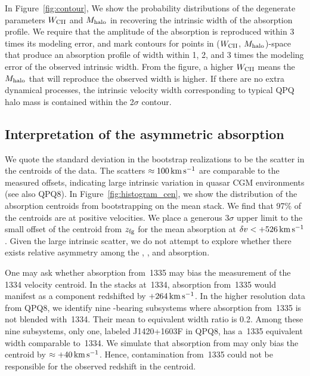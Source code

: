 \documentclass[iop]{emulateapj}
\begin{document}
In Figure~\ref{fig:contour}, We show the probability distributions of the degenerate parameters
$W_{\rm CII}$ and $M_{\rm halo}$ in recovering the intrinsic width of the absorption profile. We
require that the amplitude of the absorption is reproduced within 3 times its modeling error, and
mark contours for points in ($W_{\rm CII}$, $M_{\rm halo}$)-space that produce an absorption
profile of width within 1, 2, and 3 times the modeling error of the observed intrinsic width.
From the figure, a higher $W_{\rm CII}$ means the $M_{\rm halo}$ that will reproduce the observed
width is higher. If there are no extra dynamical processes, the intrinsic velocity width
corresponding to typical QPQ halo mass is contained within the 2$\sigma$ contour.

\subsection{Interpretation of the asymmetric absorption}
\label{sec:significance_+ve}

We quote the standard deviation in the bootstrap
realizations to be the scatter in the centroids of the data. The scatters
$\approx100\,{\rm km\,s^{-1}}$ are comparable to the measured offsets, indicating large intrinsic
variation in quasar CGM environments (see also QPQ8). In Figure~\ref{fig:histogram_cen}, we show
the distribution of the absorption centroids from bootstrapping on the  mean stack. We
find that 97\% of the centroids are at positive velocities. We place a generous $3\sigma$ upper
limit to the small offset of the centroid from $z_{\rm fg}$ for the  mean absorption at
$\delta v<+526\,{\rm km\,s^{-1}}$. Given the large intrinsic scatter, we do not attempt to explore
whether there exists relative asymmetry among the , , and 
absorption.

One may ask whether absorption from \,1335 may bias the measurement of the
\,1334 velocity centroid. In the stacks at \,1334, absorption from \,1335
would manifest as a component redshifted by $+264\,{\rm km\,s^{-1}}$.
In the higher resolution data from QPQ8, we identify nine -bearing subsystems where absorption
from \,1335 is not blended with \,1334.
Their mean  to  equivalent width ratio is 0.2.
Among these nine subsystems, only one,
labeled J1420+1603F in QPQ8, has a \,1335 equivalent width comparable to \,1334.
We simulate that absorption from  may only bias the  centroid by
$\approx+40\,{\rm km\,s^{-1}}$.
Hence, contamination from \,1335 could not be responsible for the observed redshift in
the centroid.
\end{document}
